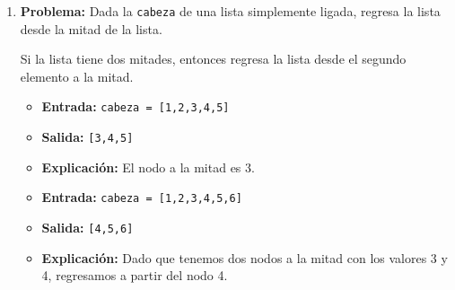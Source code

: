 \documentclass{article}
\begin{document}
\begin{enumerate}
\begin{lstlisting}[language=Java]
    public Nodo(int valor) {
        this.valor = valor;
    }
}

// definimos la clase Main que contiene el metodo para obtener el valor decimal del numero binario representado por la lista
public class Main {
    public int obtenDecimal(Nodo cabeza) {
        //  Inicializamos una variable para mantener el valor decimal en 0.
        int decimal = 0;
        Nodo actual = cabeza;

        // Recorremos la lista desde la cabeza hasta el final.
        while (actual != null) {
            // Se multilplica el valor actual por 2 y sumamos el valor del nodo actual (0 o 1).
            decimal = decimal * 2 + actual.valor;
            actual = actual.siguiente;
        }

        // Devolvemos el valor decimal del num. binario representado por la lista.
        return decimal;
    }

    public static void main(String[] args) {
        Main main = new Main();
        Nodo nodo1 = new Nodo(1);
        Nodo nodo2 = new Nodo(0);
        Nodo nodo3 = new Nodo(1);

        nodo1.siguiente = nodo2;
        nodo2.siguiente = nodo3;

        //  Llamamos al metodo obtenDecimal para obtener el valor decimal.
        int resultado = main.obtenDecimal(nodo1);

        //  Se imprime
        System.out.println("Entrada: cabeza = [1, 0, 1]");
        System.out.println("Salida: " + resultado); // imprime 5
    }
}

    \end{lstlisting}
\newpage
    \item \textbf{Problema:} Dada la \texttt{cabeza} de una lista simplemente 
    ligada, regresa la lista desde la mitad de la lista.

    Si la lista tiene dos mitades, entonces regresa la lista desde el segundo 
    elemento a la mitad.
    \begin{itemize}
        \item \textbf{Entrada:} \texttt{cabeza = [1,2,3,4,5]}
        \item \textbf{Salida:} \texttt{[3,4,5]}
        \item \textbf{Explicación:} El nodo a la mitad es 3.
        \item \textbf{Entrada:} \texttt{cabeza = [1,2,3,4,5,6]}
        \item \textbf{Salida:} \texttt{[4,5,6]}
        \item \textbf{Explicación:} Dado que tenemos dos nodos a la mitad con 
        los valores 3 y 4, regresamos a partir del nodo 4.
    \end{itemize}


\end{enumerate}
\end{document}
